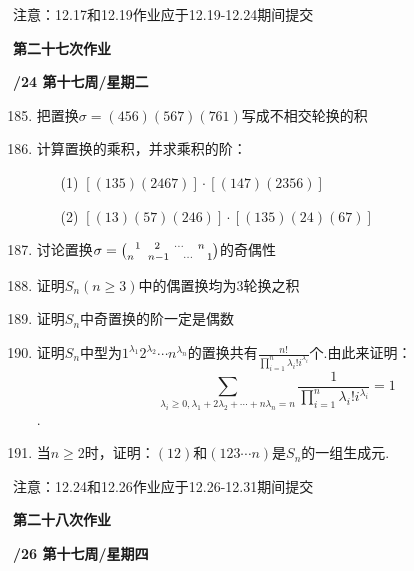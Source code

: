 \documentclass[a4paper,12pt]{article}
\begin{document}
{\color{red} 注意：12.17和12.19作业应于12.19-12.24期间提交}

\newpage
\head

\begin{center} %
	{\Large \bf 第二十七次作业} %
	\vspace{2mm}
	
	{\bf{}/24 \quad  第十七周/星期二} %
\end{center} 


\begin{enumerate}\setcounter{enumi}{184}
 \item 把置换$\sigma=(456)(567)(761)$写成不相交轮换的积
    \item 计算置换的乘积，并求乘积的阶：\begin{enumerate}
        \item[(1)] $[(135)(2467)]\cdot [(147)(2356)]$
        \item[(2)] $[(13)(57)(246)]\cdot [(135)(24)(67)]$
    \end{enumerate}
    \item 讨论置换$\sigma=\tbinom{1 \quad 2 \quad \cdots \quad n}{n \quad n-1 \quad \cdots \quad 1}$的奇偶性
    \item 证明$S_n(n\geq 3)$中的偶置换均为3轮换之积
    \item 证明$S_n$中奇置换的阶一定是偶数
    \item 证明$S_n$中型为$1^{\lambda_1}2^{\lambda_2}\cdots n^{\lambda_n}$的置换共有$\frac{n!}{\prod\limits_{i=1}^n \lambda_i !i^{\lambda_i} }$个.由此来证明：$$\sum\limits_{\lambda_i \geq 0,\lambda_1+2\lambda_2+\cdots+n\lambda_n=n} \frac{1}{\prod\limits_{i=1}^n \lambda_i !i^{\lambda_i}}=1$$.
    \item 当$n\geq 2$时，证明：$(12)$和$(123\cdots n)$是$S_n$的一组生成元.
\end{enumerate}

{\color{red} 注意：12.24和12.26作业应于12.26-12.31期间提交}


\newpage
\head

\begin{center} %
	{\Large \bf 第二十八次作业} %
	\vspace{2mm}
	
	{\bf{}/26 \quad  第十七周/星期四} %
\end{center} 
\end{document}

